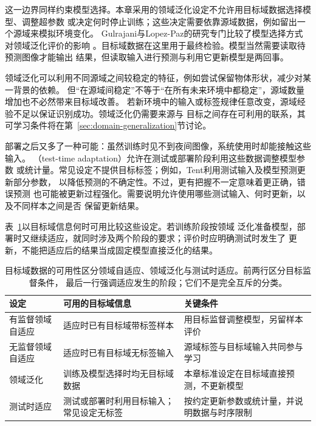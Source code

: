 这一边界同样约束模型选择。本章采用的领域泛化设定不允许用目标域数据选择模型、调整超参数
或决定何时停止训练；这些决定需要依靠源域数据，例如留出一个源域来模拟环境变化。
Gulrajani与Lopez-Paz的研究专门比较了模型选择方式对领域泛化评价的影响
。目标域数据在这里用于最终检验。模型当然需要读取待预测图像才能输出
结果，但读取输入进行预测与利用它更新模型是两回事。

领域泛化可以利用不同源域之间较稳定的特征，例如尝试保留物体形状，减少对某一背景的依赖。
但“在源域间稳定”不等于“在所有未来环境中都稳定”，源域数量增加也不必然带来目标域改善。
若新环境中的输入或标签规律任意改变，源域经验不足以保证识别成功。领域泛化仍需要来源与
目标之间存在可利用的联系，其可学习条件将在第~\ref{sec:domain-generalization}节讨论。

部署之后又多了一种可能：虽然训练时见不到夜间图像，系统使用时却能接触这些输入。
（test-time adaptation）允许在测试或部署阶段利用这些数据调整模型参数
或统计量。常见设定不提供目标标签；例如，Tent利用测试输入及模型预测更新部分参数，
以降低预测的不确定性。不过，更有把握不一定意味着更正确，错误预测
也可能被更新过程强化。需要说明允许使用哪些测试输入、何时更新，以及不同样本之间是否
保留更新结果。

表~\ref{tab:domain-transfer-settings}以目标域信息何时可用比较这些设定。若训练阶段按领域
泛化准备模型，部署时又继续适应，就同时涉及两个阶段的要求；评价时应明确测试时发生了
更新，不能把适应后的结果当成固定模型直接泛化的结果。

\begin{table}[htbp]
  \centering
  \small
  \begin{tabularx}{\linewidth}{@{}lXX@{}}
    \toprule
    \textbf{设定} & \textbf{可用的目标域信息} & \textbf{关键条件} \\
    \midrule
    有监督领域自适应 & 适应时已有目标域带标签样本 & 用目标监督调整模型，另留样本评价 \\
    无监督领域自适应 & 适应时已有目标域无标签输入 & 源域标签与目标域输入共同参与学习 \\
    领域泛化 & 训练及模型选择时均无目标域数据 & 本章标准设定在目标域直接预测，不更新模型 \\
    测试时适应 & 测试或部署时利用目标输入；常见设定无标签 & 按约定更新参数或统计量，并说明数据与时序限制 \\
    \bottomrule
  \end{tabularx}
  \caption{目标域数据的可用性区分领域自适应、领域泛化与测试时适应。前两行区分目标监督条件，
  最后一行强调适应发生的阶段；它们不是完全互斥的分类。}
  \label{tab:domain-transfer-settings}
\end{table}
\FloatBarrier

